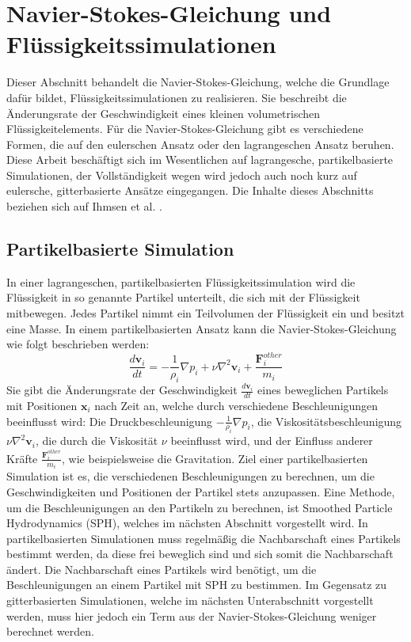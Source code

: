 \documentclass[11pt,
a4paper,
parskip=half, %
BCOR=10mm, %
english,
ngerman]{scrreprt}
\begin{document}
\section{Navier-Stokes-Gleichung und Flüssigkeitssimulationen}
Dieser Abschnitt behandelt die Navier-Stokes-Gleichung, welche die Grundlage dafür bildet, Flüssigkeitssimulationen zu realisieren.
Sie beschreibt die Änderungsrate der Geschwindigkeit eines kleinen volumetrischen Flüssigkeitelements.
Für die Navier-Stokes-Gleichung gibt es verschiedene Formen, die auf den eulerschen Ansatz oder den lagrangeschen Ansatz beruhen.
Diese Arbeit beschäftigt sich im Wesentlichen auf lagrangesche, partikelbasierte Simulationen,
der Vollständigkeit wegen wird jedoch auch noch kurz auf eulersche, gitterbasierte Ansätze eingegangen.
Die Inhalte dieses Abschnitts beziehen sich auf Ihmsen et al. \cite{ihmsen_sph_2014}.


\subsection{Partikelbasierte Simulation}
In einer lagrangeschen, partikelbasierten Flüssigkeitssimulation wird die Flüssigkeit in so genannte Partikel unterteilt,
die sich mit der Flüssigkeit mitbewegen. Jedes Partikel nimmt ein Teilvolumen der Flüssigkeit ein und besitzt eine Masse.
In einem partikelbasierten Ansatz kann die Navier-Stokes-Gleichung wie folgt beschrieben werden:
\begin{equation}
    \frac{d\textbf{v}_i}{dt} = -\frac{1}{\rho_i} \nabla p_i + \nu \nabla^2 \textbf{v}_i + \frac{\textbf{F}_i^{other}}{m_i}
\end{equation}
Sie gibt die Änderungsrate der Geschwindigkeit $\frac{d\textbf{v}_i}{dt}$ eines beweglichen Partikels mit Positionen $\textbf{x}_i$ nach Zeit an,
welche durch verschiedene Beschleunigungen beeinflusst wird:
Die Druckbeschleunigung $-\frac{1}{\rho_i} \nabla p_i$,
die Viskositätsbeschleunigung $\nu \nabla^2 \textbf{v}_i$, die durch die Viskosität $\nu$ beeinflusst wird,
und der Einfluss anderer Kräfte $\frac{\textbf{F}_i^{other}}{m_i}$,
wie beispielsweise die Gravitation.
Ziel einer partikelbasierten Simulation ist es, die verschiedenen Beschleunigungen zu berechnen,
um die Geschwindigkeiten und Positionen der Partikel stets anzupassen.
Eine Methode, um die Beschleunigungen an den Partikeln zu berechnen, ist Smoothed Particle Hydrodynamics (SPH),
welches im nächsten Abschnitt vorgestellt wird.
In partikelbasierten Simulationen muss regelmäßig die Nachbarschaft eines Partikels bestimmt werden,
da diese frei beweglich sind und sich somit die Nachbarschaft ändert.
Die Nachbarschaft eines Partikels wird benötigt, um die Beschleunigungen an einem Partikel mit SPH zu bestimmen.
Im Gegensatz zu gitterbasierten Simulationen, welche im nächsten Unterabschnitt vorgestellt werden,
muss hier jedoch ein Term aus der Navier-Stokes-Gleichung weniger berechnet werden.
\end{document}
